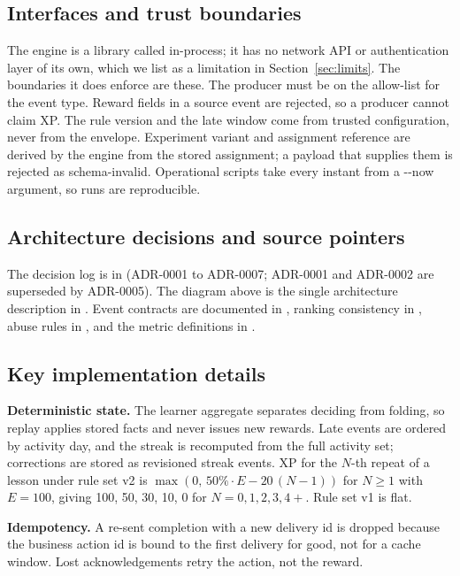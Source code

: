 \documentclass[11pt,a4paper]{article}
\newcommand{\cmd}[1]{{\sffamily\small #1}}
\newcommand{\fl}{-{}-}
\renewcommand{\_}{\textunderscore\allowbreak{}}
\begin{document}
\subsection{Interfaces and trust boundaries}

The engine is a library called in-process; it has no network API or authentication layer of its own, which we list as a limitation in Section~\ref{sec:limits}. The boundaries it does enforce are these. The producer must be on the allow-list for the event type. Reward fields in a source event are rejected, so a producer cannot claim XP. The rule version and the late window come from trusted configuration, never from the envelope. Experiment variant and assignment reference are derived by the engine from the stored assignment; a payload that supplies them is rejected as schema-invalid. Operational scripts take every instant from a \cmd{\fl now} argument, so runs are reproducible.

\subsection{Architecture decisions and source pointers}

The decision log is in  (ADR-0001 to ADR-0007; ADR-0001 and ADR-0002 are superseded by ADR-0005). The diagram above is the single architecture description in . Event contracts are documented in , ranking consistency in , abuse rules in , and the metric definitions in .

\subsection{Key implementation details}

\textbf{Deterministic state.} The learner aggregate separates deciding from folding, so replay applies stored facts and never issues new rewards. Late events are ordered by activity day, and the streak is recomputed from the full activity set; corrections are stored as revisioned streak events. XP for the $N$-th repeat of a lesson under rule set v2 is $\max(0,\, 50\% \cdot E - 20\,(N-1))$ for $N \ge 1$ with $E = 100$, giving 100, 50, 30, 10, 0 for $N = 0, 1, 2, 3, 4+$. Rule set v1 is flat.

\textbf{Idempotency.} A re-sent completion with a new delivery id is dropped because the business action id is bound to the first delivery for good, not for a cache window. Lost acknowledgements retry the action, not the reward.
\end{document}
